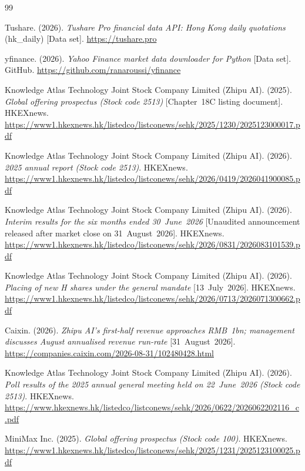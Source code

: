 \documentclass[11pt]{article}
\begin{document}
\clearpage
\begin{thebibliography}{99}

Tushare. (2026). \emph{Tushare Pro financial data API: Hong Kong daily quotations} (hk\_daily) [Data set].
\url{https://tushare.pro}

yfinance. (2026). \emph{Yahoo Finance market data downloader for Python} [Data set]. GitHub.
\url{https://github.com/ranaroussi/yfinance}

Knowledge Atlas Technology Joint Stock Company Limited (Zhipu AI). (2025). \emph{Global offering prospectus
(Stock code 2513)} [Chapter~18C listing document]. HKEXnews.
\url{https://www1.hkexnews.hk/listedco/listconews/sehk/2025/1230/2025123000017.pdf}

Knowledge Atlas Technology Joint Stock Company Limited (Zhipu AI). (2026). \emph{2025 annual report
(Stock code 2513)}. HKEXnews.
\url{https://www1.hkexnews.hk/listedco/listconews/sehk/2026/0419/2026041900085.pdf}

Knowledge Atlas Technology Joint Stock Company Limited (Zhipu AI). (2026). \emph{Interim results for the
six months ended 30~June~2026} [Unaudited announcement released after market close on 31~August~2026].
HKEXnews. \url{https://www1.hkexnews.hk/listedco/listconews/sehk/2026/0831/2026083101539.pdf}

Knowledge Atlas Technology Joint Stock Company Limited (Zhipu AI). (2026). \emph{Placing of new H shares
under the general mandate} [13~July~2026]. HKEXnews.
\url{https://www1.hkexnews.hk/listedco/listconews/sehk/2026/0713/2026071300662.pdf}

Caixin. (2026). \emph{Zhipu AI's first-half revenue approaches RMB~1bn; management discusses August annualised
revenue run-rate} [31~August~2026].
\url{https://companies.caixin.com/2026-08-31/102480428.html}

Knowledge Atlas Technology Joint Stock Company Limited (Zhipu AI). (2026). \emph{Poll results of the 2025
annual general meeting held on 22~June~2026 (Stock code 2513)}. HKEXnews.
\url{https://www.hkexnews.hk/listedco/listconews/sehk/2026/0622/2026062202116_c.pdf}

MiniMax Inc. (2025). \emph{Global offering prospectus (Stock code 100)}. HKEXnews.
\url{https://www1.hkexnews.hk/listedco/listconews/sehk/2025/1231/2025123100025.pdf}


\end{thebibliography}
\end{document}
